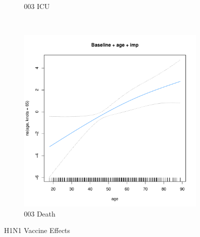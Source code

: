 \documentclass[12pt,twoside]{article}
\begin{document}
\begin{figure}[h]
{\begin{subfigure}{.49\linewidth}
                \caption{003 ICU}
        \end{subfigure}\\
        \begin{subfigure}{.49\linewidth}
                \includegraphics[width=\textwidth, page=3]{003Death_H1N1}
                \caption{003 Death}
        \end{subfigure}

        } 
        \caption{H1N1 Vaccine Effects}\label{reduced}

\par\bigskip
\par\bigskip
\par\bigskip
\par\bigskip


\end{figure}
\end{document}

